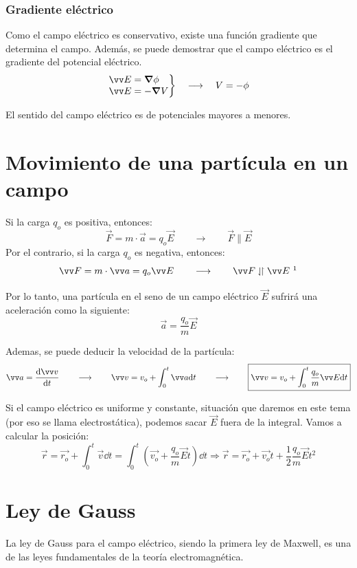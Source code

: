 \documentclass[a4paper]{book}
\begin{document}
\subsubsection{Gradiente eléctrico}
Como el campo eléctrico es conservativo, existe una función gradiente que determina el campo. Además, se puede demostrar que el campo eléctrico es el gradiente del potencial eléctrico.
\[\left. \begin{matrix*}[l]
		\vec{E}=\grad \phi\\
		\vec{E}=- \grad V
	\end{matrix*}\right\} \quad \longrightarrow \quad V = -\phi \]

El sentido del campo eléctrico es de potenciales mayores a menores.


\section{Movimiento de una partícula en un campo}
Si la carga $q_o$ es positiva, entonces:
\[\vec{F}=m\cdot \vec{a}=q_o\vec{E}\qquad \longrightarrow \qquad \vec{F}\parallel \vec{E}\]
Por el contrario, si la carga $q_o$ es negativa, entonces:
\[\vec{F}=m\cdot \vec{a}=q_o\vec{E}\qquad \longrightarrow \qquad \vec{F}\antiparallel \vec{E}\ \footnotemark\]


Por lo tanto, una partícula en el seno de un campo eléctrico $\vec{E}$ sufrirá una aceleración como la siguiente:
\[\vec{a}=\frac{q_o}{m}\vec{E}\]

Ademas, se puede deducir la velocidad de la partícula:
\[\vec{a}=\dv{\vec{v}}{t}\qquad \longrightarrow \qquad \vec{v}=v_o + \int_0^t\vec{a}\dd t\qquad \longrightarrow \qquad \boxed{\vec{v}=v_o + \int_0^t\frac{q_o}{m}\vec{E}\dd t }\]

Si el campo eléctrico es uniforme y constante, situación que daremos en este tema (por eso se llama electrostática), podemos sacar $\vec{E}$ fuera de la integral. Vamos a calcular la posición:
\[\vec{r} =\vec{r_o}+ \int_0^t\vec{v}\dd t = \int_0^t\left( \vec{v_o} + \frac{q_o}{m}\vec{E}t \right)\dd t \Rightarrow \boxed{\vec{r}=\vec{r_o}+ \vec{v_o}t+\frac{1}{2}\frac{q_o}{m}\vec{E}t^2}\]

\section{Ley de Gauss}
La ley de Gauss para el campo eléctrico, siendo la primera ley de Maxwell, es una de las leyes fundamentales de la teoría electromagnética.
\end{document}
